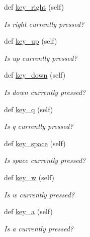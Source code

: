 \begin{DoxyCompactItemize}
def \mbox{\hyperlink{classbridges_1_1non__blocking__game_1_1_non_blocking_game_a31b6f78c39a93f0ba5350d346043bde9}{key\+\_\+right}} (self)
\begin{DoxyCompactList}\small\item\em Is right currently pressed? \end{DoxyCompactList}\item 
def \mbox{\hyperlink{classbridges_1_1non__blocking__game_1_1_non_blocking_game_a7e853081cefe51511de0c6438aeea871}{key\+\_\+up}} (self)
\begin{DoxyCompactList}\small\item\em Is up currently pressed? \end{DoxyCompactList}\item 
def \mbox{\hyperlink{classbridges_1_1non__blocking__game_1_1_non_blocking_game_af9a280c2d221140eddba0e4bcb0afb9b}{key\+\_\+down}} (self)
\begin{DoxyCompactList}\small\item\em Is down currently pressed? \end{DoxyCompactList}\item 
def \mbox{\hyperlink{classbridges_1_1non__blocking__game_1_1_non_blocking_game_a75e94a930466b607828b6ef092f810d6}{key\+\_\+q}} (self)
\begin{DoxyCompactList}\small\item\em Is q currently pressed? \end{DoxyCompactList}\item 
def \mbox{\hyperlink{classbridges_1_1non__blocking__game_1_1_non_blocking_game_a1059ffd8d5daa3a0db2e6847f5724883}{key\+\_\+space}} (self)
\begin{DoxyCompactList}\small\item\em Is space currently pressed? \end{DoxyCompactList}\item 
def \mbox{\hyperlink{classbridges_1_1non__blocking__game_1_1_non_blocking_game_abeb435c75a3022c50f472ee2a4207809}{key\+\_\+w}} (self)
\begin{DoxyCompactList}\small\item\em Is w currently pressed? \end{DoxyCompactList}\item 
def \mbox{\hyperlink{classbridges_1_1non__blocking__game_1_1_non_blocking_game_a7076d0ff62aeba49a0caf71e213361db}{key\+\_\+a}} (self)
\begin{DoxyCompactList}\small\item\em Is a currently pressed? \end{DoxyCompactList}\item 

\end{DoxyCompactItemize}
